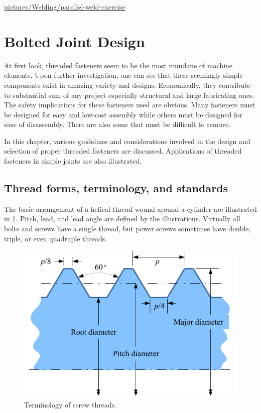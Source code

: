 \documentclass[a4paper,openany,nobib]{tufte-book}
\begin{document}
{{\url{pictures/Welding/parallel-weld-exercise}

\section{Bolted Joint Design}
\label{bolted-joint-design}
At first look, threaded fasteners seem to be the most mundane of machine
elements. Upon further investigation, one can see that these seemingly
simple components exist in amazing variety and designs. Economically,
they contribute to substantial sum of any project especially structural
and large fabricating ones. The safety implications for these fasteners
used are obvious. Many fasteners must be designed for easy and low-cost
assembly while others must be designed for ease of disassembly. There
are also some that must be difficult to remove.

In this chapter, various guidelines and considerations involved in the
design and selection of proper threaded fasteners are discussed.
Applications of threaded fasteners in simple joints are also
illustrated.

\subsection{Thread forms, terminology, and standards}
\label{thread-forms-terminology-and-standards}
The basic arrangement of a helical thread wound around a cylinder are
illustrated in  \ref{fig: bolt terms}. Pitch, lead, and
lead angle are defined by the illustrations. Virtually all bolts and
screws have a single thread, but power screws sometimes have double,
triple, or even quadruple threads.


\begin{figure}[htbp]
\centering
\includegraphics[width=.9\linewidth]{pictures/Bolt/bolt-terminology.pdf}
\caption{\label{fig: bolt terms}Terminology of screw threads.}
\end{figure}

}}
\end{document}
